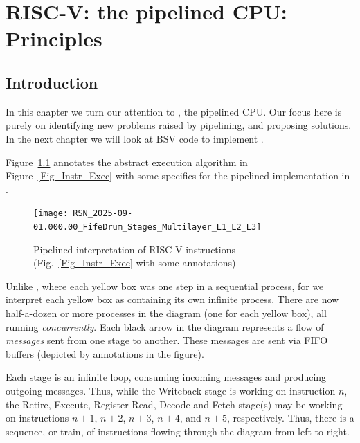 

\chapter{RISC-V: the {\FIFE} pipelined CPU: Principles}


\setcounter{page}{1}
\renewcommand{\thepage}{\arabic{chapter}-\arabic{page}}

\label{ch_Fife_Principles}


\section{Introduction}

In this chapter we turn our attention to {\FIFE}, the pipelined CPU.  Our
focus here is purely on identifying new problems raised by pipelining,
and proposing solutions.  In the next chapter we will look at BSV code
to implement {\FIFE}.

Figure~\ref{Fig_Instr_Exec_w_FIFOs} annotates the abstract execution
algorithm in Figure~\ref{Fig_Instr_Exec} with some specifics for the
pipelined implementation in {\FIFE}.
\begin{figure}[htbp]
  \centerline{\texttt{[image: RSN\_2025-09-01.000.00\_FifeDrum\_Stages\_Multilayer\_L1\_L2\_L3]}}
  \caption{\label{Fig_Instr_Exec_w_FIFOs}Pipelined interpretation of RISC-V instructions (Fig.~\ref{Fig_Instr_Exec} with some annotations)}
\end{figure}
Unlike {\DRUM}, where each yellow box was one step in a sequential
process, for {\FIFE} we interpret each yellow box as containing its own
infinite process.  There are now half-a-dozen or more processes in the
diagram (one for each yellow box), all running \emph{concurrently}.
Each black arrow in the diagram represents a flow of \emph{messages}
sent from one stage to another.  These messages are sent via FIFO
buffers (depicted by
annotations in the figure).

Each stage is an infinite loop, consuming incoming messages and
producing outgoing messages.  Thus, while the Writeback stage is
working on instruction $n$, the Retire, Execute, Register-Read, Decode
and Fetch stage(s) may be working on instructions $n+1$, $n+2$, $n+3$,
$n+4$, and $n+5$, respectively.  Thus, there is a sequence, or train,
of instructions flowing through the diagram from left to right.

